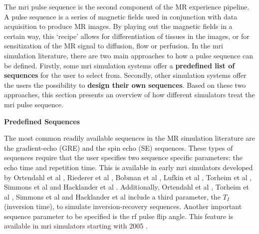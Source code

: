 The \ac{mri} pulse sequence is the second component of the MR experience pipeline.
A pulse sequence is a series of magnetic fields used in conjunction with data acquisition to produce MR images. 
By playing out the magnetic fields in a certain way, this `recipe' allows for differentiation of tissues in the images, or for sensitization of the MR signal to diffusion, flow or perfusion.
In the \ac{mri} simulation literature, there are two main approaches to how a pulse sequence can be defined.
Firstly, some \ac{mri} simulation systems offer a \textbf{predefined list of sequences} for the user to select from.
Secondly, other simulation systems offer the users the possibility to \textbf{design their own sequences}.
Based on these two approaches, this section presents an overview of how different simulators treat the \ac{mri} pulse sequence.

\hfill

\large \textbf{Predefined Sequences} \normalsize

The most common readily available sequences in the MR simulation literature are the gradient-echo (GRE) and the spin echo (SE) sequences.
These types of sequences require that the user specifies two sequence specific parameters: the echo time and repetition time.
This is available in early \ac{mri} simulators developed by Ortendahl et al \cite{Ortendahl1984}, Riederer et al \cite{Riederer1984}, Bobman et al \cite{Bobman1985}, Lufkin et al \cite{Lufkin1986}, Torheim et al \cite{Torheim1994}, Simmons et al \cite{Simmons1996} and Hacklander et al \cite{Hacklander2005}.
Additionally, Ortendahl et al \cite{Ortendahl1984}, Torheim et al \cite{Torheim1994}, Simmons et al \cite{Simmons1996} and Hacklander et al \cite{Hacklander2005} include a third parameter, the $T_I$ (inversion time), to simulate inversion-recovery sequences.
Another important sequence parameter to be specified is the \ac{rf} pulse flip angle. 
This feature is available in \ac{mri} simulators starting with 2005 \cite{Benoit-Cattin2005}.


